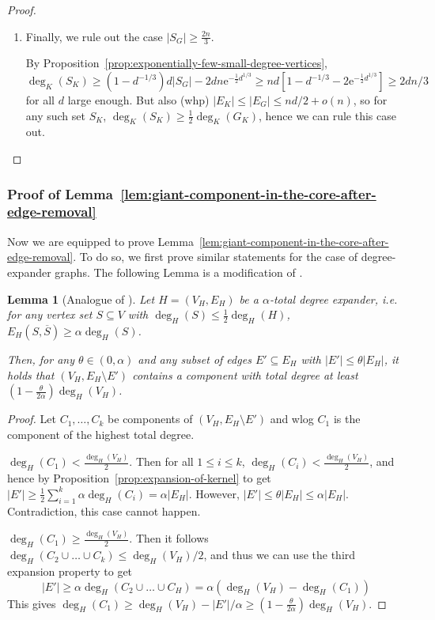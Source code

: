 \documentclass[11pt]{article}
\theoremstyle{plain}
\newtheorem{lemma}[theorem]{Lemma}
\newcommand{\emm}{\mathrm{e}}
\newcommand{\1}{\mathbb{1}}
\begin{document}
\begin{proof}
\begin{enumerate}
        \item Finally, we rule out the case \(|S_G|\geq \frac{2n}{3}\).
        
        By Proposition~\ref{prop:exponentially-few-small-degree-vertices}, \(\deg_K(S_K)\geq (1-d^{-1/3})d|S_G| - 2dn\emm^{-\frac 12 d^{1/3}} \geq nd[1-d^{-1/3}-2\emm^{-\frac 12 d^{1/3}}] \geq 2dn/3\) for all \(d\) large enough. But also (whp) \(|E_K|\leq |E_G|\leq nd / 2 + o(n)\), so for any such set \(S_K\), \(\deg_K(S_K)\geq\frac{1}{2}\deg_K(G_K)\), hence we can rule this case out.\qedhere
    \end{enumerate}    
\end{proof}

\subsubsection{Proof of Lemma~\ref{lem:giant-component-in-the-core-after-edge-removal}}

Now we are equipped to prove Lemma~\ref{lem:giant-component-in-the-core-after-edge-removal}. To do so, we first prove similar statements for the case of degree-expander graphs. The following Lemma is a modification of \cite[Lemma 2.3]{trevisan2016expanders}.

\begin{lemma}[Analogue of {\cite[Lemma 2.3]{trevisan2016expanders}}]\label{lem:giant-component-after-edge-removal-in-expanders}
    Let \(H=(V_H,E_H)\) be a \(\alpha\)-total degree expander, i.e. for any vertex set \(S\subseteq V\) with \(\deg_H(S)\leq \tfrac12\deg_H(H)\), \(E_H(S,\overline S)\geq\alpha\deg_H(S)\).

    Then, for any \(\theta\in(0,\alpha)\) and any subset of edges \(E'\subseteq E_H\) with \(|E'|\leq \theta |E_H|\), it holds that \((V_H, E_H\setminus E')\) contains a component with total degree at least \(\left(1 - \tfrac{\theta}{2\alpha}\right)\deg_H(V_H)\).
\end{lemma}
\begin{proof}
    Let \(C_1,\dots,C_k\) be components of \((V_H,E_H\setminus E')\) and wlog \(C_1\) is the component of the highest total degree.

     \(\deg_H(C_1) < \frac{\deg_H(V_H)}{2}\). Then for all \(1\leq i\leq k\), \(\deg_H(C_i) < \frac{\deg_H(V_H)}{2}\), and hence by Proposition~\ref{prop:expansion-of-kernel} to get \(|E'| \geq \frac{1}{2} \sum_{i=1}^k \alpha \deg_H(C_i) = \alpha |E_H|\). However, \(|E'|\leq \theta |E_H|\leq \alpha|E_H|\). Contradiction, this case cannot happen.

     \(\deg_H(C_1) \geq \frac{\deg_H(V_H)}{2}\). Then it follows \(\deg_H(C_2 \cup \dots \cup C_k) \leq \deg_H(V_H) / 2\), and thus we can use the third expansion property to get
    \[|E'|\geq \alpha \deg_H(C_2\cup\dots\cup C_H) = \alpha(\deg_H(V_H) - \deg_H(C_1))\]
    This gives $
    \deg_H(C_1) \geq \deg_H(V_H) - |E'|/\alpha \geq (1 - \frac{\theta}{2\alpha})\deg_H(V_H)$.
\end{proof}
\end{document}
